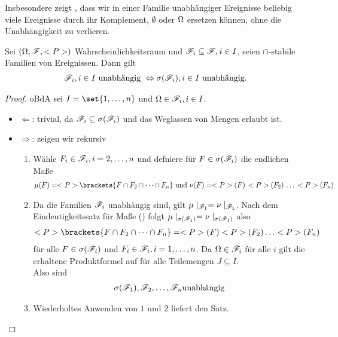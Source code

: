 Insbesondere zeigt , dass wir in einer Familie unabhängiger Ereignisse beliebig viele Ereignisse durch ihr Komplement, $\emptyset$ oder $\Omega$ ersetzen können, ohne die Unabhängigkeit zu verlieren.

\begin{proposition}
	Sei $(\Omega, \mathscr F, <P>)$ Wahrscheinlichkeitsraum und $\mathscr F_i \subseteq \mathscr F, i \in I$, seien $\cap$-stabile Familien von Ereignissen. Dann gilt
	\begin{align*}
	\mathscr F_i, i \in I \text{ unabhängig } \Leftrightarrow \sigma(\mathscr F_i), i \in I \text{ unabhängig}. 
	\end{align*}
\end{proposition}

\begin{proof}
	oBdA sei $I = \set{1, \dots, n}$ und $\Omega \in \mathscr F_i, i \in I$.
	\begin{itemize}
		\item $\Leftarrow$: trivial, da $\mathscr F_i \subseteq \sigma(\mathscr F_i)$ und das Weglassen von Mengen erlaubt ist.
		\item $\Rightarrow$: zeigen wir rekursiv
		\begin{enumerate}
			\item Wähle $F_i \in \mathscr F_i, i = 2, \dots,n$ und defniere für $F \in \sigma(\mathscr F_i)$ die endlichen Maße
			\begin{align*}
				\mu(F) = \P\brackets{ F \cap F_2 \cap \cdots \cap F_n} \und \nu(F) = \P(F) \, \P(F_2) \, \dots \, \P(F_n)
			\end{align*}
			\item Da die Familien $\mathscr F_i$ unabhängig sind, gilt
			$\mu\mid_{\mathscr F_1} = \nu\mid_{\mathscr F_1}$.
			Nach dem Eindeutigkeitssatz für Maße () folgt $\mu\mid_{\sigma(\mathscr F_1)} = \nu\mid_{\sigma(\mathscr F_1)}$ also
			\begin{align*}
				\P\brackets{ F \cap F_2 \cap \cdots \cap F_n} = \P(F) \P(F_2) \dots \P(F_n)
			\end{align*}
			für alle $F \in \sigma(\mathscr F_i)$ und $F_i \in \mathscr F_i, i = 1, \dots, n$. Da $\Omega \in \mathscr F_i$ für alle $i$ gilt die erhaltene Produktformel auf für alle Teilemengen $J \subseteq I$.\\
			Also sind
			\begin{align*}
			\sigma(\mathscr F_1), \mathscr F_2, \dots, \mathscr F_n \text{unabhängig}
			\end{align*}
			\item Wiederholtes Anwenden von $1$ und $2$ liefert den Satz.
		\end{enumerate}
	\end{itemize}
\end{proof}

